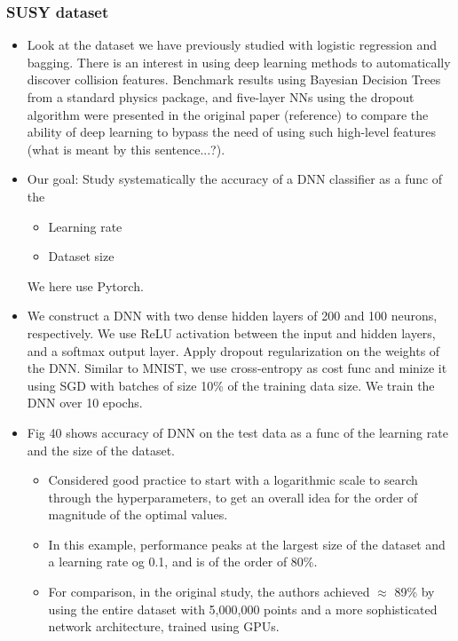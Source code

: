 \documentclass[norsk,a4paper,11pt]{article}
\begin{document}
\subsubsection{SUSY dataset}
\begin{itemize}
	\item Look at the dataset we have previously studied with logistic regression and bagging. There is an interest in using deep learning methods to automatically discover collision features. Benchmark results using Bayesian Decision Trees from a standard physics package, and five-layer NNs using the dropout algorithm were presented in the original paper (reference) to compare the ability of deep learning to bypass the need of using such high-level features (what is meant by this sentence...?).
	\item Our goal: Study systematically the accuracy of a DNN classifier as a func of the 
	\begin{itemize}
		\item Learning rate
		\item Dataset size
	\end{itemize}
	We here use Pytorch.
	\item We construct a DNN with two dense hidden layers of 200 and 100 neurons, respectively. We use ReLU activation between the input and hidden layers, and a softmax output layer. Apply dropout regularization on the weights of the DNN. Similar to MNIST, we use cross-entropy as cost func and minize it using SGD with batches of size 10\% of the training data size. We train the DNN over 10 epochs. 
	\item Fig 40 shows accuracy of DNN on the test data as a func of the learning rate and the size of the dataset.
	\begin{itemize}
		\item Considered good practice to start with a logarithmic scale to search through the hyperparameters, to get an overall idea for the order of magnitude of the optimal values. 
		\item In this example, performance peaks at the largest size of the dataset and a learning rate og 0.1, and is of the order of 80\%. 
		\item For comparison, in the original study, the authors achieved $\approx$ 89\% by using the entire dataset with 5,000,000 points and a more sophisticated network architecture, trained using GPUs.
	\end{itemize}
\end{itemize}
\end{document}
